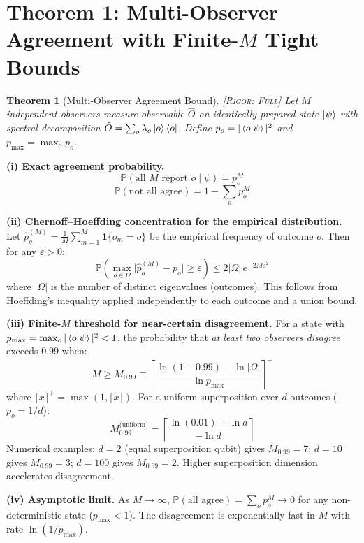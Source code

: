 \documentclass[11pt,a4paper]{article}
\newtheorem{theorem}{Theorem}[section]
\theoremstyle{definition}
\theoremstyle{remark}
\newcommand{\Pbb}{\mathbb{P}}
\newcommand{\rigorFull}{\textsc{[Rigor: Full]}}
\begin{document}
\section{Theorem 1: Multi-Observer Agreement with Finite-$M$ Tight Bounds}

\begin{theorem}[Multi-Observer Agreement Bound]
\label{thm:agreement}
\rigorFull
Let $M$ independent observers measure observable $\hat{O}$ on identically prepared state $\ket{\psi}$ with spectral decomposition $\hat{O} = \sum_{o} \lambda_o \ket{o}\bra{o}$. Define $p_o = |\braket{o|\psi}|^2$ and $p_{\max} = \max_o p_o$.
\end{theorem}

\medskip
\noindent\textbf{(i) Exact agreement probability.}
\[
\Pbb(\text{all } M \text{ report } o \mid \psi) = p_o^{M}
\]
\[
\Pbb(\text{not all agree}) = 1 - \sum_{o} p_o^{M}
\]

\noindent\textbf{(ii) Chernoff--Hoeffding concentration for the empirical distribution.}
Let $\hat{p}_o^{(M)} = \frac{1}{M}\sum_{m=1}^{M} \mathbf{1}\{o_m = o\}$ be the empirical frequency of outcome $o$. Then for any $\varepsilon > 0$:
\[
\Pbb\!\left(\max_{o \in \Omega} \bigl|\hat{p}_o^{(M)} - p_o\bigr| \geq \varepsilon\right) \leq 2|\Omega|\, e^{-2M\varepsilon^2}
\]
where $|\Omega|$ is the number of distinct eigenvalues (outcomes). This follows from Hoeffding's inequality applied independently to each outcome and a union bound.

\noindent\textbf{(iii) Finite-$M$ threshold for near-certain disagreement.}
For a state with $p_{\max} = \max_o |\braket{o|\psi}|^2 < 1$, the probability that \emph{at least two observers disagree} exceeds $0.99$ when:
\[
M \geq M_{0.99} \equiv \left\lceil \frac{\ln(1 - 0.99) - \ln|\Omega|}{\ln p_{\max}} \right\rceil^{+}
\]
where $\lceil x \rceil^{+} = \max(1, \lceil x \rceil)$. For a uniform superposition over $d$ outcomes ($p_o = 1/d$):
\[
M_{0.99}^{\text{(uniform)}} = \left\lceil \frac{\ln(0.01) - \ln d}{-\ln d} \right\rceil
\]
Numerical examples: $d=2$ (equal superposition qubit) gives $M_{0.99} = 7$; $d=10$ gives $M_{0.99} = 3$; $d=100$ gives $M_{0.99} = 2$. Higher superposition dimension accelerates disagreement.

\noindent\textbf{(iv) Asymptotic limit.}
As $M \to \infty$, $\Pbb(\text{all agree}) = \sum_o p_o^{M} \to 0$ for any non-deterministic state ($p_{\max} < 1$). The disagreement is exponentially fast in $M$ with rate $\ln(1/p_{\max})$.
\end{document}
